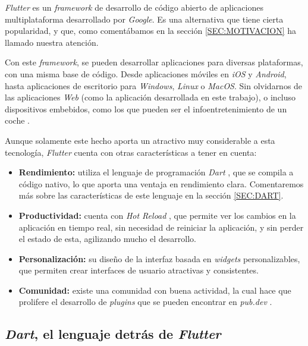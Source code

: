 \textit{Flutter} \cite{flutter} es un \textit{framework} de desarrollo de código abierto de aplicaciones multiplataforma desarrollado 
por \textit{Google}. Es una alternativa que tiene cierta popularidad, y que, como comentábamos en la sección \ref{SEC:MOTIVACION}
ha llamado nuestra atención.

Con este \textit{framework}, se pueden desarrollar aplicaciones para diversas plataformas, con una misma base de código.
Desde aplicaciones móviles en \textit{iOS} y \textit{Android}, hasta aplicaciones de escritorio para \textit{Windows}, \textit{Linux} o \textit{MacOS}. Sin olvidarnos de
las aplicaciones \textit{Web} (como la aplicación desarrollada en este trabajo), o incluso dispositivos 
embebidos, como los que pueden ser el infoentretenimiento de un coche \cite{flutter_car}. 

Aunque solamente este hecho aporta un atractivo muy considerable a esta tecnología, \textit{Flutter} cuenta con otras características a tener en cuenta:

\begin{itemize}
  \item \textbf{Rendimiento:} utiliza el lenguaje de programación \textit{Dart} \cite{dart}, que se compila a código nativo, lo que aporta una ventaja en rendimiento clara.
   Comentaremos más sobre las características de este lenguaje en la sección \ref{SEC:DART}.
  \item \textbf{Productividad:} cuenta con \textit{Hot Reload} \cite{hot_reload}, que permite ver los cambios en la aplicación en tiempo real, sin necesidad de reiniciar 
  la aplicación, y sin perder el estado de esta, agilizando mucho el desarrollo.
  \item \textbf{Personalización:} su diseño de la interfaz basada en \textit{widgets} personalizables, que permiten crear interfaces de usuario atractivas y consistentes.
  \item \textbf{Comunidad:} existe una comunidad con buena actividad, la cual hace que prolifere el desarrollo de \textit{plugins} que se pueden encontrar en \textit{pub.dev} \cite{pub_dev}.

\end{itemize}





\subsection{\textit{Dart}, el lenguaje detrás de \textit{Flutter}\label{SEC:DART}}

